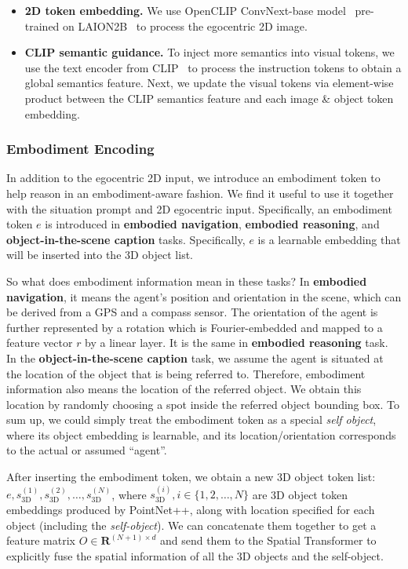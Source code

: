 \begin{itemize}[leftmargin=*]
    \item \textbf{2D token embedding.} We use OpenCLIP ConvNext-base model~\citep{liu2022convnet} pre-trained on LAION2B~\citep{schuhmann2022laion} to process the egocentric 2D image.
    \item \textbf{CLIP semantic guidance.} To inject more semantics into visual tokens, we use the text encoder from CLIP~\citep{radford2021learning} to process the instruction tokens to obtain a global semantics feature. Next, we update the visual tokens via element-wise product between the CLIP semantics feature and each image \& object token embedding.
\end{itemize}

\subsubsection{Embodiment Encoding}\label{sec:supp_embodiment}
In addition to the egocentric 2D input, we introduce an embodiment token to help \agent reason in an embodiment-aware fashion. We find it useful to use it together with the situation prompt and 2D egocentric input. Specifically, an embodiment token $e$ is introduced in \textbf{embodied navigation}, \textbf{embodied reasoning}, and \textbf{object-in-the-scene caption} tasks. Specifically, $e$ is a learnable embedding that will be inserted into the 3D object list.

So what does embodiment information mean in these tasks? In \textbf{embodied navigation}, it means the agent's position and orientation in the scene, which can be derived from a GPS and a compass sensor. The orientation of the agent is further represented by a rotation which is Fourier-embedded and mapped to a feature vector $r$ by a linear layer. It is the same in \textbf{embodied reasoning} task.
In the \textbf{object-in-the-scene caption} task, we assume the agent is situated at the location of the object that is being referred to. Therefore, embodiment information also means the location of the referred object. We obtain this location by randomly choosing a spot inside the referred object bounding box. To sum up, we could simply treat the embodiment token as a special \textit{self object}, where its object embedding is learnable, and its location/orientation corresponds to the actual or assumed ``agent''.

After inserting the embodiment token, we obtain a new 3D object token list: $e, s_{\text{3D}}^{(1)}, s_{\text{3D}}^{(2)}, \dots, s_{\text{3D}}^{(N)}$, where $s_{\text{3D}}^{(i)}, i\in \{1, 2, \dots, N\}$ are 3D object token embeddings produced by PointNet++, along with location specified for each object (including the \textit{self-object}). We can concatenate them together to get a feature matrix $O\in \mathbf{R}^{(N+1)\times d}$ and send them to the Spatial Transformer to explicitly fuse the spatial information of all the 3D objects and the self-object.

